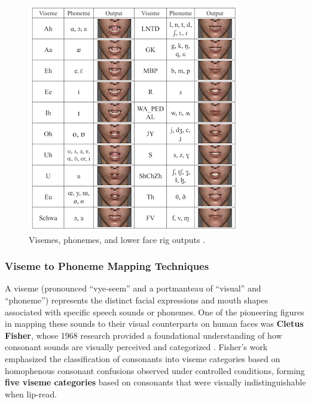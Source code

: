 \documentclass[12pt]{article}
\begin{document}
\begin{figure}
\centering
\vspace{-5mm}
\includegraphics[width=\linewidth]{visemenet.png}
\caption{Visemes, phonemes, and lower face rig outputs \cite{Zhou2018visemenet}.}
\label{fig:viseme-mapping}
\end{figure}
\subsubsection{Viseme to Phoneme Mapping Techniques}

A viseme (pronounced “vye-seem” and a portmanteau of “visual” and “phoneme”) represents the distinct facial expressions and mouth shapes associated with specific speech sounds or phonemes. One of the pioneering figures in mapping these sounds to their visual counterparts on human faces was \textbf{Cletus Fisher}, whose 1968 research provided a foundational understanding of how consonant sounds are visually perceived and categorized \cite{Fisher1968ConfusionsConsonants.}. Fisher’s work emphasized the classification of consonants into viseme categories based on homophenous consonant confusions observed under controlled conditions, forming \textbf{five viseme categories} based on consonants that were visually indistinguishable when lip-read.
\end{document}
